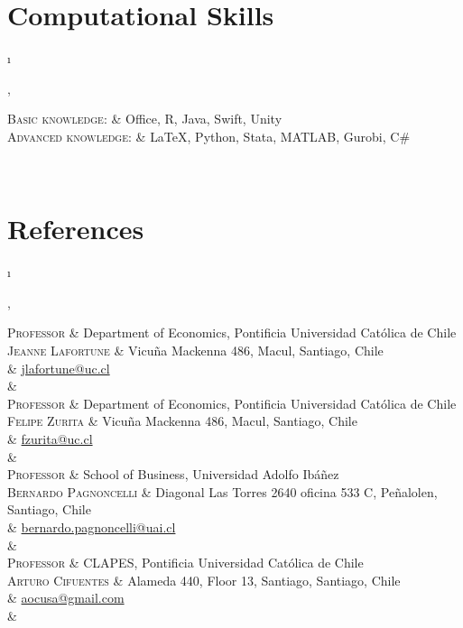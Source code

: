 \documentclass[a4paper, margins=2cm,10pt]{article}
\newcommand{\tablength}{}
\newcommand{\setTabParams}[1]{\renewcommand\tablength{}\forcsvlist{\listadd\tablength}{#1}}
\newcommand{\setCols}[1]{			%
	\ifnum0=\i						%
		\ifdim0cm=#1				%
			\def \firstCol {r}		%
		\else						%
			\def \firstCol {p{#1}}		%
		\fi						%
	\else \ifnum1=\i				%
		\ifdim0cm=#1				%
			\def \secondCol {l}		%
		\else						%
			\def \secondCol{p{#1}}	%
		\fi						%
	\else \ifnum2=\i				%
		\ifnum0=#1				%
			\def \sep {}			%
		\else						%
			\def \sep {|}			%
		\fi						%
	\fi \fi \fi						%
	\advance\i by1					%
}
\newcommand{\tab}[1]{					%
	\newcount\i						%
	\forlistloop{\setCols}{\tablength}		%
	\begin{tabular}{\firstCol \sep \secondCol}	%
		#1							%
	\end{tabular} \\						%
}
\begin{document}
\section{Computational Skills}
\setTabParams{0cm,0cm,0}

\tab{
\textsc{Basic knowledge:}
	&	Office, R, Java, Swift, Unity 	\\[0.5ex]

\textsc{Advanced knowledge:}
	&	{\fb \LaTeX}, Python, Stata, MATLAB, Gurobi, C\#	\\
}

\section{References}
\setTabParams{0cm,0cm,0}

\tab{
\textsc{Professor}
	&	Department of Economics, Pontificia Universidad Católica de Chile		\\[0.2ex]
\textsc{Jeanne Lafortune}
	& 	Vicuña Mackenna 486, Macul, Santiago, Chile					\\[0.2ex]
	&	\href{mailto:jlafortune@uc.cl}{jlafortune@uc.cl}					\\[0.2ex]
	&	\\

\textsc{Professor}
	&	Department of Economics, Pontificia Universidad Católica de Chile		\\[0.2ex]
\textsc{Felipe Zurita}
	& 	Vicuña Mackenna 486, Macul, Santiago, Chile					\\[0.2ex]
	&	\href{mailto:fzurita@uc.cl}{fzurita@uc.cl}						\\[0.2ex]
	&	\\

\textsc{Professor}
	&	School of Business, Universidad Adolfo Ibáñez					\\[0.2ex]
\textsc{Bernardo Pagnoncelli}
	& 	Diagonal Las Torres 2640 oficina 533 C, Peñalolen, Santiago, Chile	\\[0.2ex]
	&	\href{mailto:bernardo.pagnoncelli@uai.cl}{bernardo.pagnoncelli@uai.cl}	\\[0.2ex]
	&	\\

\textsc{Professor}
	&	CLAPES, Pontificia Universidad Católica de Chile 					\\[0.2ex]
\textsc{Arturo Cifuentes}
	& 	Alameda 440, Floor 13, Santiago, Santiago, Chile					\\[0.2ex]
	&	\href{mailto:aocusa@gmail.com}{aocusa@gmail.com}				\\[0.2ex]
	&	\\
}
\end{document}
